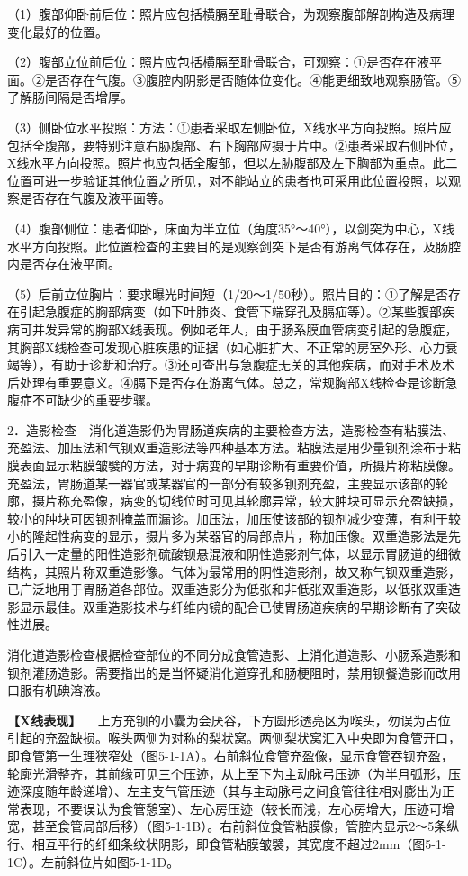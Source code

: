 （1）腹部仰卧前后位：照片应包括横膈至耻骨联合，为观察腹部解剖构造及病理变化最好的位置。

（2）腹部立位前后位：照片应包括横膈至耻骨联合，可观察：①是否存在液平面。②是否存在气腹。③腹腔内阴影是否随体位变化。④能更细致地观察肠管。⑤了解肠间隔是否增厚。

（3）侧卧位水平投照：方法：①患者采取左侧卧位，X线水平方向投照。照片应包括全腹部，要特别注意右胁腹部、右下胸部应摄于片中。②患者采取右侧卧位，X线水平方向投照。照片也应包括全腹部，但以左胁腹部及左下胸部为重点。此二位置可进一步验证其他位置之所见，对不能站立的患者也可采用此位置投照，以观察是否存在气腹及液平面等。

（4）腹部侧位：患者仰卧，床面为半立位（角度35°～40°），以剑突为中心，X线水平方向投照。此位置检查的主要目的是观察剑突下是否有游离气体存在，及肠腔内是否存在液平面。

（5）后前立位胸片：要求曝光时间短（1/20～1/50秒）。照片目的：①了解是否存在引起急腹症的胸部病变（如下叶肺炎、食管下端穿孔及膈疝等）。②某些腹部疾病可并发异常的胸部X线表现。例如老年人，由于肠系膜血管病变引起的急腹症，其胸部X线检查可发现心脏疾患的证据（如心脏扩大、不正常的房室外形、心力衰竭等），有助于诊断和治疗。③还可查出与急腹症无关的其他疾病，而对手术及术后处理有重要意义。④膈下是否存在游离气体。总之，常规胸部X线检查是诊断急腹症不可缺少的重要步骤。

2．造影检查　消化道造影仍为胃肠道疾病的主要检查方法，造影检查有粘膜法、充盈法、加压法和气钡双重造影法等四种基本方法。粘膜法是用少量钡剂涂布于粘膜表面显示粘膜皱襞的方法，对于病变的早期诊断有重要价值，所摄片称粘膜像。充盈法，胃肠道某一器官或某器官的一部分有较多钡剂充盈，主要显示该部的轮廓，摄片称充盈像，病变的切线位时可见其轮廓异常，较大肿块可显示充盈缺损，较小的肿块可因钡剂掩盖而漏诊。加压法，加压使该部的钡剂减少变薄，有利于较小的隆起性病变的显示，摄片多为某器官的局部点片，称加压像。双重造影法是先后引入一定量的阳性造影剂硫酸钡悬混液和阴性造影剂气体，以显示胃肠道的细微结构，其照片称双重造影像。气体为最常用的阴性造影剂，故又称气钡双重造影，已广泛地用于胃肠道各部位。双重造影分为低张和非低张双重造影，以低张双重造影显示最佳。双重造影技术与纤维内镜的配合已使胃肠道疾病的早期诊断有了突破性进展。

消化道造影检查根据检查部位的不同分成食管造影、上消化道造影、小肠系造影和钡剂灌肠造影。需要指出的是当怀疑消化道穿孔和肠梗阻时，禁用钡餐造影而改用口服有机碘溶液。

\textbf{【X线表现】}
　上方充钡的小囊为会厌谷，下方圆形透亮区为喉头，勿误为占位引起的充盈缺损。喉头两侧为对称的梨状窝。两侧梨状窝汇入中央即为食管开口，即食管第一生理狭窄处（图5-1-1A）。右前斜位食管充盈像，显示食管吞钡充盈，轮廓光滑整齐，其前缘可见三个压迹，从上至下为主动脉弓压迹（为半月弧形，压迹深度随年龄递增）、左主支气管压迹（其与主动脉弓之间食管往往相对膨出为正常表现，不要误认为食管憩室）、左心房压迹（较长而浅，左心房增大，压迹可增宽，甚至食管局部后移）（图5-1-1B）。右前斜位食管粘膜像，管腔内显示2～5条纵行、相互平行的纤细条纹状阴影，即食管粘膜皱襞，其宽度不超过2mm（图5-1-1C）。左前斜位片如图5-1-1D。

